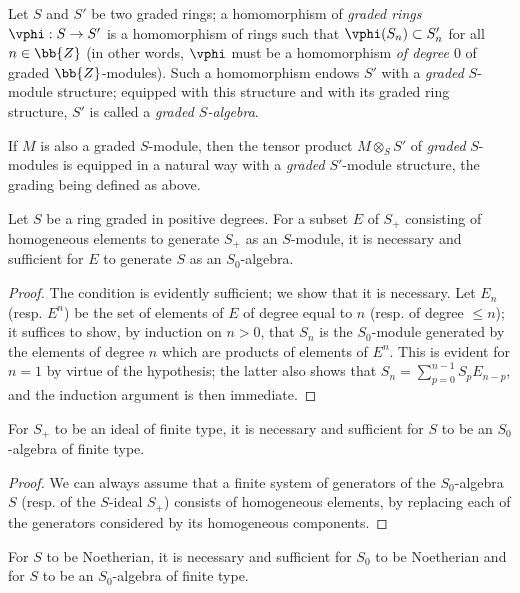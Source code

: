 \begin{env}[2.1.2]
Let $S$ and $S'$ be two graded rings;
a homomorphism of \emph{graded rings $\vphi:S\to S'$} is a homomorphism of rings such that $\vphi(S_n)\subset S_n'$ for all $n\in\bb{Z}$ (in other words, $\vphi$ must be a homomorphism \emph{of degree $0$} of graded $\bb{Z}$-modules).
Such a homomorphism endows $S'$ with a \emph{graded} $S$-module structure;
equipped with this structure and with its graded ring structure, $S'$ is called a \emph{graded $S$-algebra}.

If $M$ is also a graded $S$-module, then the tensor product $M\otimes_S S'$ of \emph{graded} $S$-modules is equipped in a natural way with a \emph{graded} $S'$-module structure, the grading being defined as above.
\end{env}

\begin{lemma}[2.1.3]
\label{II.2.1.3}
Let $S$ be a ring graded in positive degrees.
For a subset $E$ of $S_+$ consisting of homogeneous elements to generate $S_+$ as an $S$-module, it is necessary and sufficient for $E$ to generate $S$ as an $S_0$-algebra.
\end{lemma}

\begin{proof}
The condition is evidently sufficient; we show that it is necessary.
Let $E_n$ (resp. $E^n$) be the set of elements of $E$ of degree equal to $n$ (resp. of degree $\leq n$);
it suffices to show, by induction on $n>0$, that $S_n$ is the $S_0$-module generated by the elements of degree $n$ which are products of elements of $E^n$.
This is evident for $n=1$ by virtue of the hypothesis;
the latter also shows that $S_n=\sum_{p=0}^{n-1}S_p E_{n-p}$, and the induction argument is then immediate.
\end{proof}

\begin{corollary}[2.1.4]
\label{II.2.1.4}
For $S_+$ to be an ideal of finite type, it is necessary and sufficient for $S$ to be an $S_0$-algebra of finite type.
\end{corollary}

\begin{proof}
We can always assume that a finite system of generators of the $S_0$-algebra $S$ (resp. of the $S$-ideal $S_+$) consists of homogeneous elements, by replacing each of the generators considered by its homogeneous components.
\end{proof}

\begin{corollary}[2.1.5]
\label{II.2.1.5}
For $S$ to be Noetherian, it is necessary and sufficient for $S_0$ to be Noetherian and for $S$ to be an $S_0$-algebra of finite type.
\end{corollary}

